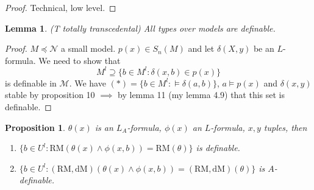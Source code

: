 \documentclass[letterpaper, 12pt]{article}
\newcommand{\cM}{\mathcal{M}}
\newcommand{\cN}{\mathcal{N}}
\newcommand{\RM}{\mbox{RM}}
\newcommand{\dM}{\mbox{dM}}
\theoremstyle{stdthm}
\newtheorem{lem}[thm]{Lemma}
\newtheorem{prop}[thm]{Proposition}
\theoremstyle{stddef}
\theoremstyle{stdnonum}
\theoremstyle{stdqands}
\theoremstyle{stdbold}
\begin{document}
\begin{proof}
Technical, low level. 
\end{proof}

\begin{lem}(T totally transcedental)
All types over models are definable. 
\end{lem}

\begin{proof}
$M \preceq \cN$ a small model. $p(x) \in S_n(M)$ and let $\delta(X,y)$ be an $L$-formula. We need to show that 
\[ \tag{*} M^l \supseteq \{b \in M^l: \delta(x,b) \in p(x) \} \]
is definable in $\cM$. We have $(*) = \{b \in M^l : \models \delta(a,b)\}$, $a\models p(x)$ and $\delta(x,y)$ stable by proposition 10 $\implies$ by lemma 11 (my lemma 4.9) that this set is definable.  
\end{proof}


\begin{prop}
$\theta(x)$ is an $L_A$-formula,  $\phi(x)$ an $L$-formula, $x,y$ tuples, then 
\begin{enumerate}
\item $\{b \in U^l: \RM(\theta(x) \wedge \phi(x,b)) = \RM(\theta)\}$ is definable. 
\item $\{b \in U^l: (\RM,\dM)(\theta(x) \wedge  \phi(x,b)) = (\RM,\dM)(\theta)\}$ is $A$-definable. 
\end{enumerate}

\end{prop}
\end{document}
